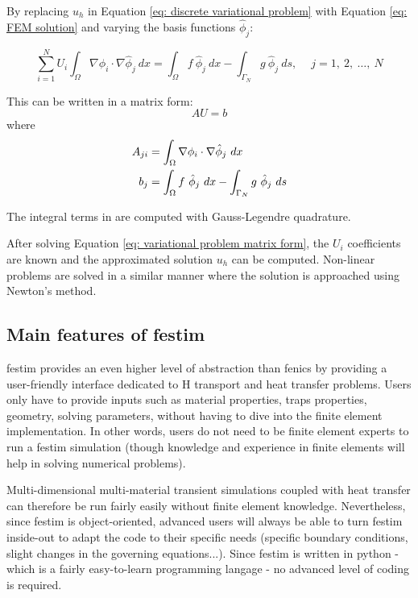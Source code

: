 By replacing $u_h$ in Equation \ref{eq: discrete variational problem} with Equation \ref{eq: FEM solution} and varying the basis functions $\hat{\phi}_j$:

\begin{equation}
    \sum^N_{i=1} U_i \int_\Omega \nabla \phi_i \cdot \nabla \hat{\phi}_j \ dx = \int_\Omega f \ \hat{\phi}_j \ dx - \int_{\Gamma_N} g \ \hat{\phi}_j \ ds , \quad \ j = 1, \ 2, \ \ldots, \ N
\end{equation}

This can be written in a matrix form:
\begin{equation}
    AU = b
    \label{eq: variational problem matrix form}
\end{equation}
where
\begin{subequations}
    \begin{align}
        A_{ji} &= \int_\Omega \nabla \phi_i \cdot \nabla \hat{\phi}_j \ dx \\
        b_{j} &= \int_\Omega f \ \hat{\phi}_j \ dx - \int_{\Gamma_N} g \ \hat{\phi}_j \ ds
    \end{align}
    \labeq{eq: matrices A and b}
\end{subequations}

The integral terms in  are computed with Gauss-Legendre quadrature.

After solving Equation \ref{eq: variational problem matrix form}, the $U_i$ coefficients are known and the approximated solution $u_h$ can be computed.
Non-linear problems are solved in a similar manner where the solution is approached using Newton's method.

\subsection{Main features of \gls{festim}}
\gls{festim} provides an even higher level of abstraction than \gls{fenics} by providing a user-friendly interface dedicated to H transport and heat transfer problems.
Users only have to provide inputs such as material properties, traps properties, geometry, solving parameters, without having to dive into the finite element implementation.
In other words, users do not need to be finite element experts to run a \gls{festim} simulation (though knowledge and experience in finite elements will help in solving numerical problems).

Multi-dimensional multi-material transient simulations coupled with heat transfer can therefore be run fairly easily without finite element knowledge.
Nevertheless, since \gls{festim} is object-oriented, advanced users will always be able to turn \gls{festim} inside-out to adapt the code to their specific needs (specific boundary conditions, slight changes in the governing equations...).
Since \gls{festim} is written in python - which is a fairly easy-to-learn programming langage - no advanced level of coding is required.

